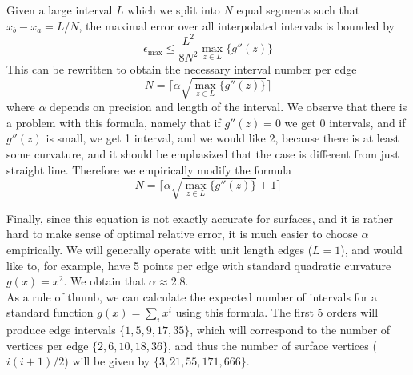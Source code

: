 \noindent
Given a large interval $L$ which we split into $N$ equal segments such that $x_b - x_a = L/N$, the maximal error over all interpolated intervals is bounded by
\begin{equation}
	\epsilon_{\max} \leq \frac{L^2}{8 N^2} \max_{z \in L} \{ g''(z) \}
\end{equation}
\noindent
This can be rewritten to obtain the necessary interval number per edge
\begin{equation}
	N = \biggl \lceil \alpha \sqrt{ \max_{z \in L} \{ g''(z) \} } \biggr \rceil
\end{equation}
\noindent
where $\alpha$ depends on precision and length of the interval. We observe that there is a problem with this formula, namely that if $g''(z) = 0$ we get 0 intervals, and if $g''(z)$ is small, we get 1 interval, and we would like 2, because there is at least some curvature, and it should be emphasized that the case is different from just straight line. Therefore we empirically modify the formula
\begin{equation}
	N = \biggl \lceil \alpha \sqrt{ \max_{z \in L} \{ g''(z) \} } + 1 \biggr \rceil
\end{equation}

\noindent
Finally, since this equation is not exactly accurate for surfaces, and it is rather hard to make sense of optimal relative error, it is much easier to choose $\alpha$ empirically. We will generally operate with unit length edges ($L = 1$), and would like to, for example, have 5 points per edge with standard quadratic curvature $g(x) = x^2$. We obtain that $\alpha \approx 2.8$. \\

\noindent
As a rule of thumb, we can calculate the expected number of intervals for a standard function $g(x) = \sum_i x^i$ using this formula. The first 5 orders will produce edge intervals $\{ 1, 5, 9, 17, 35\}$, which will correspond to the number of vertices per edge $\{ 2, 6, 10, 18, 36\}$, and thus the number of surface vertices ($i(i+1)/2$) will be given by $\{3, 21, 55, 171, 666\}$.